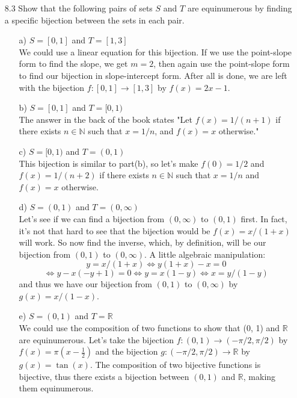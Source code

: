 \documentclass[12pt]{article}
\begin{document}
\begin{enumerate}
\item[8.3] Show that the following pairs of sets $S$ and $T$ are equinumerous by finding a specific bijection between the sets in each pair.
\begin{enumerate}
\item[a)] $S = [0, 1]$ and $T = [1, 3]$ \\
We could use a linear equation for this bijection. If we use the point-slope form to find the slope, we get $m = 2$, then again use the point-slope form to find our bijection in slope-intercept form. After all is done, we are left with the bijection $f: [0, 1] \rightarrow [1, 3]$ by $f(x) = 2x - 1$.
\item[b)] $S = [0, 1]$ and $T = [0, 1)$ \\
The answer in the back of the book states "Let $f(x) = 1/(n + 1)$ if there exists $n \in
\mathbb{N}$ such that $x = 1/n$, and $f(x) = x$ otherwise."
\item[c)] $S = [0, 1)$ and $T = (0, 1)$\\
This bijection is similar to part(b), so let's make $f(0) = 1/2$ and $f(x) = 1/(n + 2)$
if there exists $n \in \mathbb{N}$ such that $x = 1/n$ and $f(x) = x$ otherwise.
\item[d)] $S = (0, 1)$ and $T = (0, \infty )$ \\
Let's see if we can find a bijection from $(0, \infty )$ to $(0, 1)$ first. In fact, it's not that
hard to see that the bijection would be $f(x) = x/(1 + x)$ will work. So now find the inverse, which, by definition, will be our bijection from $(0, 1)$ to $(0, \infty )$. A little algebraic manipulation: \[
y = x/(1 + x) \Leftrightarrow y(1 + x) - x = 0 \]
\[ \Leftrightarrow y - x(-y + 1) = 0 
\Leftrightarrow y = x(1 - y) \Leftrightarrow x = y/(1 - y) \]
and thus we have our bijection from $(0, 1)$ to $(0, \infty )$ by $g(x) = x/(1 - x)$.
\item[e)] $S = (0, 1)$ and $T = \mathbb{R}$ \\
We could use the composition of two functions to show that (0, 1) and $\mathbb{R}$ are equinumerous. Let's take the bijection $f: (0, 1) \rightarrow (-\pi /2, \pi /2)$ by $f(x) = \pi (x - \frac{1}{2})$ and the bijection $g: (-\pi /2, \pi /2) \rightarrow \mathbb{R}$ by $g(x) = \tan (x)$. The composition of two bijective functions is bijective, thus there exists a bijection between $(0, 1)$ and $\mathbb{R}$, making them equinumerous.
\end{enumerate}


\end{enumerate}
\end{document}
